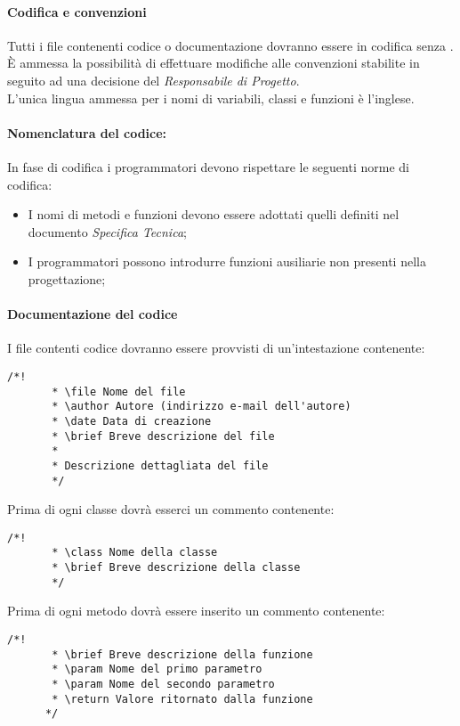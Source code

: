    \paragraph{Codifica e convenzioni}
   Tutti i file contenenti codice o documentazione dovranno essere in codifica  senza .\\
   È ammessa la possibilità di effettuare modifiche alle convenzioni stabilite in seguito ad una decisione del \emph{Responsabile di Progetto}.\\
   L’unica lingua ammessa per i nomi di variabili, classi e funzioni è l’inglese.

\paragraph{Nomenclatura del codice:}
In fase di codifica i programmatori devono rispettare le seguenti norme di codifica:
\begin{itemize}
\item I nomi di metodi e funzioni devono essere adottati quelli definiti nel documento \emph{Specifica Tecnica};
\item I programmatori possono introdurre funzioni ausiliarie non presenti nella progettazione;
\end{itemize}   
     
   
   \paragraph{Documentazione del codice}
     I file contenti codice dovranno essere provvisti di un'intestazione contenente:
     \begin{lstlisting}[frame=single]
       /*!
       * \file Nome del file
       * \author Autore (indirizzo e-mail dell'autore)
       * \date Data di creazione
       * \brief Breve descrizione del file
       *
       * Descrizione dettagliata del file
       */
     \end{lstlisting}
     Prima di ogni classe dovrà esserci un commento contenente:
     \begin{lstlisting}[frame=single]
       /*!
       * \class Nome della classe
       * \brief Breve descrizione della classe
       */
     \end{lstlisting}
     Prima di ogni metodo dovrà essere inserito un commento contenente:
     \begin{lstlisting}[frame=single]
       /*!
       * \brief Breve descrizione della funzione
       * \param Nome del primo parametro
       * \param Nome del secondo parametro
       * \return Valore ritornato dalla funzione
      */
  \end{lstlisting}
      